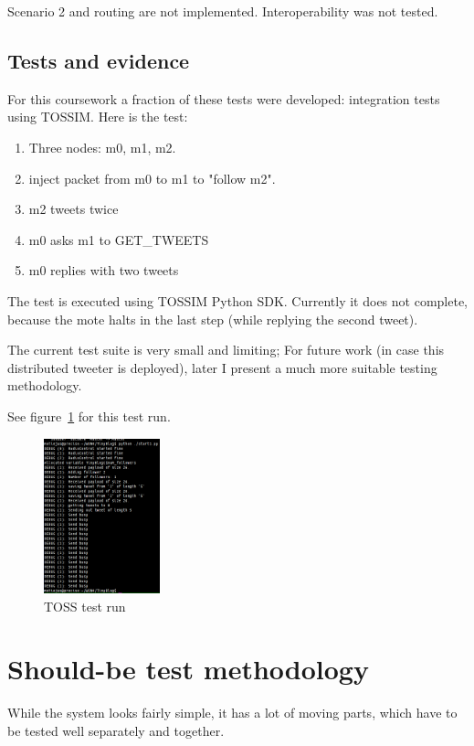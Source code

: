 \documentclass[english,11pt]{article}
\numberwithin{equation}{section}
\begin{document}
Scenario 2 and routing are not implemented. Interoperability was not tested.

\subsection{Tests and evidence}

For this coursework a fraction of these tests were developed: integration tests
using TOSSIM. Here is the test:

\begin{enumerate}
    \item Three nodes: m0, m1, m2.
    \item inject packet from m0 to m1 to "follow m2".
    \item m2 tweets twice
    \item m0 asks m1 to GET\_TWEETS
    \item m0 replies with two tweets
\end{enumerate}

The test is executed using TOSSIM Python SDK. Currently it does not complete,
because the mote halts in the last step (while replying the second tweet).

The current test suite is very small and limiting; For future work (in case this
distributed tweeter is deployed), later I present a much more suitable testing
methodology.

See figure~\ref{fig:test_suite} for this test run.

\begin{figure}
    \centering
    \includegraphics[width=0.3\textwidth]{test_suite.png}
    \caption{TOSS test run}
    \label{fig:test_suite}
\end{figure}

\section{Should-be test methodology}

While the system looks fairly simple, it has a lot of moving parts, which have
to be tested well separately and together.
\end{document}
